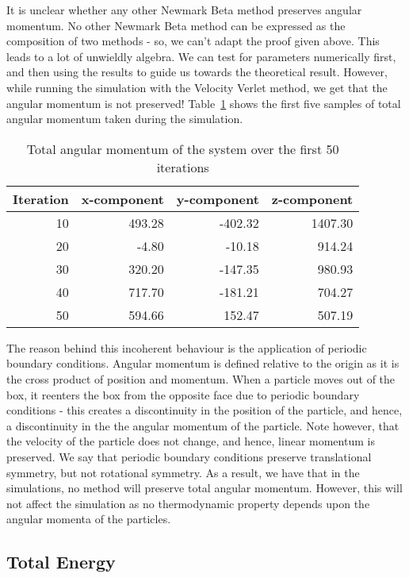 \documentclass[../Main.tex]{subfiles}
\begin{document}
It is unclear whether any other Newmark Beta method preserves angular momentum. No other Newmark Beta method can be expressed as the composition of two methods - so, we can't adapt the proof given above. This leads to a lot of unwieldly algebra.
We can test for parameters  numerically first, and then using the results to guide us towards the theoretical result. However, while running the simulation with the Velocity Verlet method, we get that the angular momentum is not preserved! Table~\ref{tbl:total_angular_momentum_50_iterations} shows the first five samples of total angular momentum taken during the simulation. 
\begin{table}[h]
	\centering
	\begin{tabular}{ |r|r|r|r| }
		\hline
		Iteration & x-component & y-component & z-component\\
		\hline
		10 & 493.28 & -402.32 & 1407.30 \\
		20 & -4.80 & -10.18 & 914.24 \\
		30 & 320.20 & -147.35 & 980.93 \\
		40 & 717.70 & -181.21 & 704.27 \\
		50 & 594.66 & 152.47 & 507.19 \\
		\hline
	\end{tabular}
	\caption{Total angular momentum of the system over the first 50 iterations}
	\label{tbl:total_angular_momentum_50_iterations}
\end{table}

The reason behind this incoherent behaviour is the application of periodic boundary conditions. Angular momentum is defined relative to the origin as it is the cross product of position and momentum. When a particle moves out of the box, it reenters the box from the opposite face due to periodic boundary conditions - this creates a discontinuity in the position of the particle, and hence, a discontinuity in the the angular momentum of the particle. Note however, that the velocity of the particle does not change, and hence, linear momentum is preserved. We say that periodic boundary conditions preserve translational symmetry, but not rotational symmetry.
As a result, we have that in the simulations, no method will preserve total angular momentum. However, this will not affect the simulation as no thermodynamic property depends upon the angular momenta of the particles.
 
\subsection{Total Energy}
\end{document}
